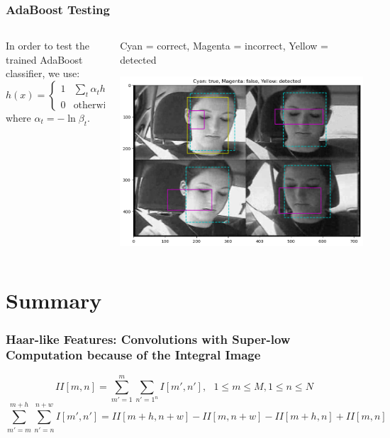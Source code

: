 \documentclass{beamer}
\begin{document}
\begin{frame}
  \frametitle{AdaBoost Testing}
  \begin{columns}
    \begin{column}{0.5\textwidth}
      In order to test the trained AdaBoost classifier, we use:
      \begin{displaymath}
        h(x)=\begin{cases}
        1 & \sum_t \alpha_th_t(x)>\frac{1}{2}\sum_t\alpha_t\\
        0 & \mbox{otherwise}
        \end{cases},
      \end{displaymath}
      where $\alpha_t=-\ln\beta_t$.
    \end{column}
    \begin{column}{0.5\textwidth}
      Cyan = correct, Magenta = incorrect, Yellow = detected
      \centerline{\includegraphics[height=0.7\textheight]{figs/detection_result.png}}
    \end{column}
  \end{columns}
\end{frame}

  
\section[Summary]{Summary}
\setcounter{subsection}{1}

\begin{frame}
  \frametitle{Haar-like Features: Convolutions with Super-low Computation because of the Integral Image}

  \begin{displaymath}
    II[m,n] = \sum_{m'=1}^m\sum_{n'=1^n} I[m',n'],~~~1\le m\le M,1\le n\le N
  \end{displaymath}
  \begin{displaymath}
    \sum_{m'=m}^{m+h}\sum_{n'=n}^{n+w}I[m',n'] = II[m+h,n+w]-II[m,n+w]-II[m+h,n]+II[m,n]
  \end{displaymath}
\end{frame}
\end{document}
